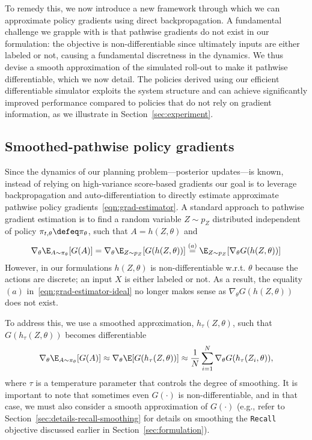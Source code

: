 To remedy this,  we now introduce a new framework through which we can approximate policy gradients using direct backpropagation.
A fundamental challenge we grapple with is that pathwise gradients do not exist in our formulation: the objective is non-differentiable since ultimately inputs are either labeled or not, causing a fundamental discretness in the dynamics. 
We thus  devise a smooth approximation of the simulated roll-out to make it pathwise differentiable, which we now detail. The policies derived using our efficient differentiable simulator exploits the system structure and can achieve significantly improved performance compared to    policies 
that do not rely on gradient information,
as we illustrate in Section~\ref{sec:experiment}.  



\subsection{Smoothed-pathwise  policy gradients}

Since the dynamics of our planning problem---posterior updates---is known, instead of relying on high-variance score-based gradients
our goal is to leverage backpropagation and auto-differentiation to directly estimate approximate pathwise policy gradients~\eqref{eqn:grad-estimator}. 
A standard approach to pathwise gradient estimation is to find a random variable $Z \sim p_Z$ distributed independent of policy $\pi_{t,\theta}\defeq\pi_{\theta}$,  such that $A = {h}(Z,\theta)$ and
\begin{align}
    \nabla_\theta \E_{A \sim \pi_{\theta}}[G(A)] = \nabla_{\theta}\E_{Z\sim p_Z}[ G(h(Z, \theta))] \stackrel{(a)}{=}  \E_{Z\sim p_Z}[\nabla_{\theta} G(h(Z, \theta))]
    \label{eqn:grad-estimator-ideal}
\end{align} 
However,  in our formulations $h(Z, \theta)$ is non-differentiable w.r.t. $\theta$ because the actions are discrete; an input $X$ is either labeled or not.
As a result, the equality $(a)$ in~\eqref{eqn:grad-estimator-ideal}
no longer makes sense as $\nabla_{\theta}G(h(Z, \theta))$ does not exist. 

To address this, we  use a smoothed approximation, ${h}_{\tau}(Z,\theta)$, such that  $G({h}_{\tau}(Z,\theta))$ becomes differentiable
\begin{align}
\nabla_\theta \E_{A \sim \pi_{\theta}}[G(A)] \approx  \nabla_{\theta} \E[ G(h_{\tau}(Z, \theta))]
\approx \frac{1}{N}\sum_{i=1}^N \nabla_\theta G(h_\tau(Z_i,\theta)),
\label{eqn:grad-estimator}
\end{align}
where $\tau$ is a temperature parameter that controls the degree of smoothing.
It is important to note that sometimes even $G(\cdot)$ is non-differentiable, and in that case,
we must also consider a smooth approximation of $G(\cdot)$ 
(e.g., refer to Section~\ref{sec:details-recall-smoothing} for details on smoothing the \texttt{Recall} objective discussed earlier in Section~\ref{sec:formulation}). 

